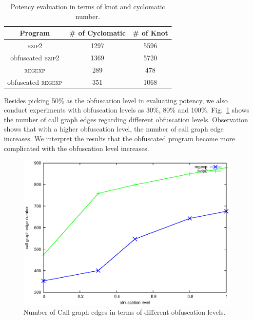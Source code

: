 \documentclass[lnicst]{svmultln}
\newcommand{\F}{Fig.}
\begin{document}
\begin{table}
  \centering
 \caption{Potency evaluation in terms of knot and cyclomatic number.}
 \label{tab:three}
 \begin{tabular}{|c|c|c|}
 \hline 
 \textbf{Program} & \textbf{\# of Cyclomatic} & \textbf{\# of Knot} \\
 \hline
\textsc{bzip2} & 1297 & 5596  \\ 
 \hline
obfuscated \textsc{bzip2} & 1369 & 5720  \\
 \hline
\textsc{regexp} & 289 & 478 \\ 
 \hline
obfuscated \textsc{regexp} & 351 & 1068 \\
 \hline
\end{tabular}
\end{table}

Besides picking 50\% as the obfuscation level in evaluating potency, we also
conduct experiments with obfuscation levels as 30\%, 80\% and 100\%.
\F~\ref{fig:seven} shows the number of call graph edges regarding different
obfuscation levels. Observation shows that with a higher obfuscation level, the
number of call graph edge increases. We interpret the results that the
obfuscated program become more complicated with the obfuscation level increases.

\begin{figure}
  \includegraphics[width=0.9\linewidth]{cg.eps}
  \caption{Number of Call graph edges in terms of different obfuscation levels.}
  \label{fig:seven}
\end{figure}
\end{document}
